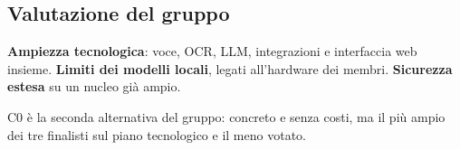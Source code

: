 \subsection{Valutazione del gruppo}

\begin{fortedeboli}
     {\textbf{Ampiezza tecnologica}: voce, OCR, LLM, integrazioni e
      interfaccia web insieme.}
     {\textbf{Limiti dei modelli locali}, legati all'hardware dei membri.}
     {\textbf{Sicurezza estesa} su un nucleo già ampio.}
\end{fortedeboli}

C0 è la seconda alternativa del gruppo: concreto e senza costi, ma il più
ampio dei tre finalisti sul piano tecnologico e il meno votato.
